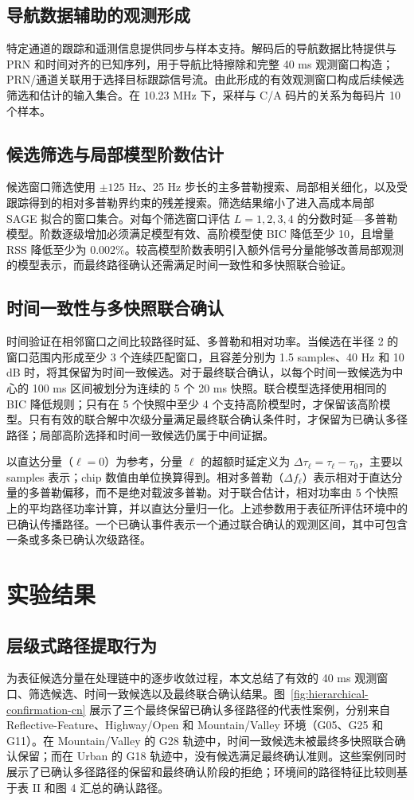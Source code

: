 \documentclass[conference]{IEEEtran}
\begin{document}
\subsection{导航数据辅助的观测形成}
特定通道的跟踪和遥测信息提供同步与样本支持。解码后的导航数据比特提供与 PRN 和时间对齐的已知序列，用于导航比特擦除和完整 40 ms 观测窗口构造；PRN/通道关联用于选择目标跟踪信号流。由此形成的有效观测窗口构成后续候选筛选和估计的输入集合。在 10.23 MHz 下，采样与 C/A 码片的关系为每码片 10 个样本。

\subsection{候选筛选与局部模型阶数估计}
候选窗口筛选使用 $\pm125$ Hz、25 Hz 步长的主多普勒搜索、局部相关细化，以及受跟踪得到的相对多普勒界约束的残差搜索。筛选结果缩小了进入高成本局部 SAGE 拟合的窗口集合。对每个筛选窗口评估 $L=1,2,3,4$ 的分数时延—多普勒模型。阶数逐级增加必须满足模型有效、高阶模型使 BIC 降低至少 10，且增量 RSS 降低至少为 0.002\%。较高模型阶数表明引入额外信号分量能够改善局部观测的模型表示，而最终路径确认还需满足时间一致性和多快照联合验证。

\subsection{时间一致性与多快照联合确认}
时间验证在相邻窗口之间比较路径时延、多普勒和相对功率。当候选在半径 2 的窗口范围内形成至少 3 个连续匹配窗口，且容差分别为 1.5 samples、40 Hz 和 10 dB 时，将其保留为时间一致候选。对于最终联合确认，以每个时间一致候选为中心的 100 ms 区间被划分为连续的 5 个 20 ms 快照。联合模型选择使用相同的 BIC 降低规则；只有在 5 个快照中至少 4 个支持高阶模型时，才保留该高阶模型。只有有效的联合解中次级分量满足最终联合确认条件时，才保留为已确认多径路径；局部高阶选择和时间一致候选仍属于中间证据。

以直达分量（$\ell=0$）为参考，分量 $\ell$ 的超额时延定义为 $\Delta\tau_\ell=\tau_\ell-\tau_0$，主要以 samples 表示；chip 数值由单位换算得到。相对多普勒（$\Delta f_\ell$）表示相对于直达分量的多普勒偏移，而不是绝对载波多普勒。对于联合估计，相对功率由 5 个快照上的平均路径功率计算，并以直达分量归一化。上述参数用于表征所评估环境中的已确认传播路径。一个已确认事件表示一个通过联合确认的观测区间，其中可包含一条或多条已确认次级路径。

\section{实验结果}
\subsection{层级式路径提取行为}
为表征候选分量在处理链中的逐步收敛过程，本文总结了有效的 40 ms 观测窗口、筛选候选、时间一致候选以及最终联合确认结果。图~\ref{fig:hierarchical-confirmation-cn} 展示了三个最终保留已确认多径路径的代表性案例，分别来自 Reflective-Feature、Highway/Open 和 Mountain/Valley 环境（G05、G25 和 G11）。在 Mountain/Valley 的 G28 轨迹中，时间一致候选未被最终多快照联合确认保留；而在 Urban 的 G18 轨迹中，没有候选满足最终确认准则。这些案例同时展示了已确认多径路径的保留和最终确认阶段的拒绝；环境间的路径特征比较则基于表 II 和图 4 汇总的确认路径。
\end{document}
